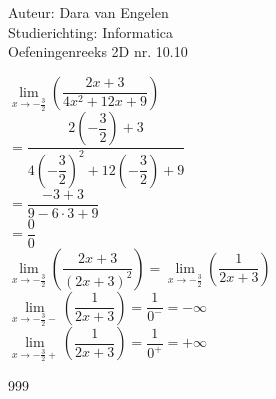 \documentclass[a4paper]{article}
\begin{document}
  
\noindent \large Auteur: Dara van Engelen\\
\noindent \large Studierichting: Informatica\\
\noindent \large Oefeningenreeks 2D nr. 10.10\\

\medskip

\normalsize


$\lim\limits_{x\rightarrow - \tfrac{3}{2}} \left(\dfrac{2x + 3}{4x^2 + 12x + 9}\right) $\\

$= \dfrac{2\left(-\dfrac{3}{2}\right) + 3}{4\left(-\dfrac{3}{2}\right)^2 + 12\left(-\dfrac{3}{2}\right) + 9}$\\

$= \dfrac{-3 + 3}{9 - 6\cdot3 + 9}$\\

$= \dfrac{0}{0}$\\

$\lim\limits_{x\rightarrow - \tfrac{3}{2}} \left(\dfrac{2x + 3}{(2x + 3)^2}\right) =\lim\limits_{x\rightarrow - \tfrac{3}{2}} \left(\dfrac{1}{2x + 3}\right)$\\

$ \lim\limits_{x\rightarrow - \tfrac{3}{2} -} \left(\dfrac{1}{2x + 3}\right) = \dfrac{1}{0^-} = -\infty$\\

$\lim\limits_{x\rightarrow - \tfrac{3}{2} +} \left(\dfrac{1}{2x + 3}\right) = \dfrac{1}{0^+} = +\infty$\\


\begin{thebibliography}{999}
\end{thebibliography}
\end{document}
